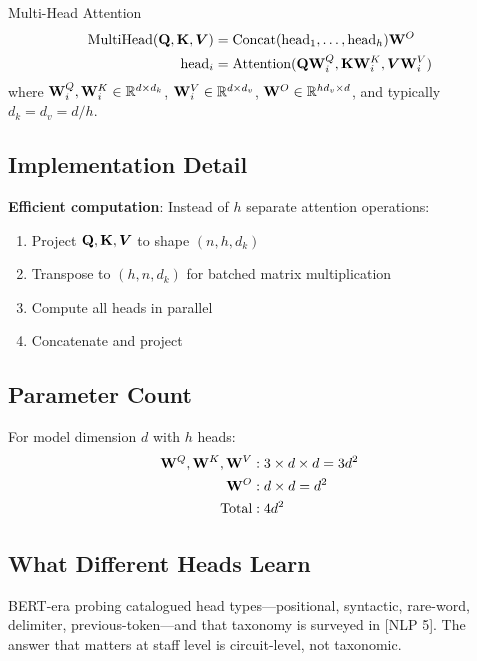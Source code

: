 \begin{mathresult}{Multi-Head Attention}
\begin{align}
\text{MultiHead}(\mathbf{Q}, \mathbf{K}, \bm{V}) &= \text{Concat}(\text{head}_1, \ldots, \text{head}_h)\mathbf{W}^O \\
\text{head}_i &= \text{Attention}(\mathbf{Q}\mathbf{W}_i^Q, \mathbf{K}\mathbf{W}_i^K, \bm{V}\mathbf{W}_i^V)
\end{align}
where $\mathbf{W}_i^Q, \mathbf{W}_i^K \in \mathbb{R}^{d \times d_k}$, $\mathbf{W}_i^V \in \mathbb{R}^{d \times d_v}$, $\mathbf{W}^O \in \mathbb{R}^{hd_v \times d}$, and typically $d_k = d_v = d/h$.
\end{mathresult}

\subsection{Implementation Detail}

\textbf{Efficient computation}: Instead of $h$ separate attention operations:
\begin{enumerate}
    \item Project $\mathbf{Q}, \mathbf{K}, \bm{V}$ to shape $(n, h, d_k)$
    \item Transpose to $(h, n, d_k)$ for batched matrix multiplication
    \item Compute all heads in parallel
    \item Concatenate and project
\end{enumerate}

\subsection{Parameter Count}

For model dimension $d$ with $h$ heads:
\begin{align}
\mathbf{W}^Q, \mathbf{W}^K, \mathbf{W}^V &: 3 \times d \times d = 3d^2 \\
\mathbf{W}^O &: d \times d = d^2 \\
\text{Total} &: 4d^2
\end{align}

\subsection{What Different Heads Learn}

BERT-era probing catalogued head types---positional, syntactic, rare-word, delimiter, previous-token---and that taxonomy is surveyed in [NLP 5]. The answer that matters at staff level is circuit-level, not taxonomic.

